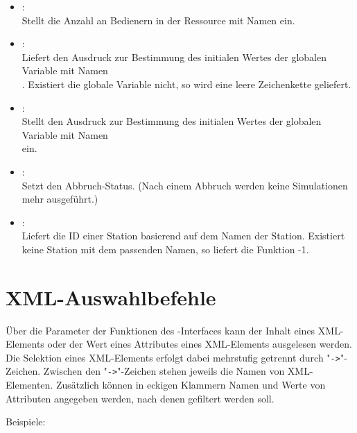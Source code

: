 \begin{itemize}
\item
{}:\\
Stellt die Anzahl an Bedienern in der Ressource mit Namen  ein.

\item
{}:\\
Liefert den Ausdruck zur Bestimmung des initialen Wertes der globalen Variable
mit Namen\\. Existiert die globale Variable nicht, so wird
eine leere Zeichenkette geliefert.

\item
{}:\\
Stellt den Ausdruck zur Bestimmung des initialen Wertes der globalen Variable
mit Namen\\ ein. 

\item
{}:\\
Setzt den Abbruch-Status. (Nach einem Abbruch werden keine Simulationen mehr ausgeführt.)

\item
{}:\\
Liefert die ID einer Station basierend auf dem Namen der Station.
Existiert keine Station mit dem passenden Namen, so liefert die Funktion -1.

\end{itemize}



\chapter{XML-Auswahlbefehle}

Über die Parameter der Funktionen des -Interfaces kann der Inhalt eines XML-Elements oder der Wert eines
Attributes eines XML-Elements ausgelesen werden. Die Selektion eines XML-Elements erfolgt dabei mehrstufig
getrennt durch "\texttt{->}"-Zeichen. Zwischen den "\texttt{->}"-Zeichen stehen jeweils die Namen von XML-Elementen.
Zusätzlich können in eckigen Klammern Namen und Werte von Attributen angegeben werden, nach denen gefiltert werden soll.

Beispiele:

